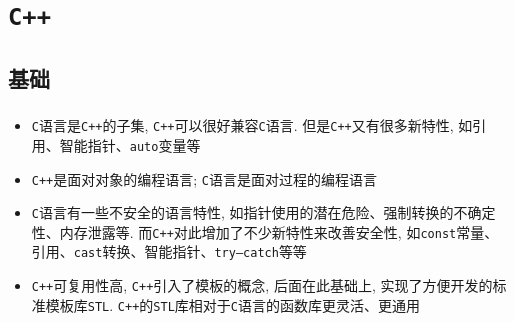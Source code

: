 \documentclass[10pt,twoside]{ctexart}
\begin{document}
\newpage
\thispagestyle{empty}
\tableofcontents
\shadowsize=0.5mm
\newpage
\setcounter{page}{1}
\section{\tt C++}
\subsection{基础}
\subsubsection[ISOK:{\tt C}和{\tt C++}区别]{}
\begin{itemize}
	\item {\tt C}语言是{\tt C++}的子集, {\tt C++}可以很好兼容{\tt C}语言. 但是{\tt C++}又有很多新特性, 如引用、智能指针、{\tt auto}变量等
	\item {\tt C++}是面对对象的编程语言; {\tt C}语言是面对过程的编程语言
	\item {\tt C}语言有一些不安全的语言特性, 如指针使用的潜在危险、强制转换的不确定性、内存泄露等. 而{\tt C++}对此增加了不少新特性来改善安全性, 如{\tt const}常量、引用、{\tt cast}转换、智能指针、{\tt try—catch}等等
	\item {\tt C++}可复用性高, {\tt C++}引入了模板的概念, 后面在此基础上, 实现了方便开发的标准模板库{\tt STL}. {\tt C++}的{\tt STL}库相对于{\tt C}语言的函数库更灵活、更通用
\end{itemize}
\subsubsection[多态的实现原理和应用场景]{\color{purple}{多态的实现原理和应用场景}}
\subsubsection[线程安全的实现及标准容器库的线程安全性]{\color{purple}{线程安全的实现及标准容器库的线程安全性}}
\subsubsection[{\tt sort}算法是怎么实现的]{}
\end{document}
